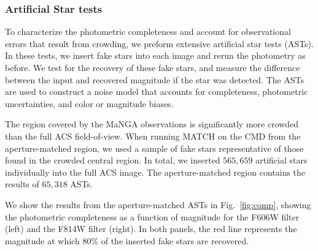 \documentclass[preprint2]{aastex62}
\begin{document}
\subsubsection{Artificial Star tests}

To characterize the photometric completeness and account for observational errors that result from crowding, we preform extensive artificial star tests (ASTs). In these tests, we insert fake stars into each image and rerun the photometry as before. We test for the recovery of these fake stars, and measure the difference between the input and recovered magnitude if the star was detected. The ASTs are used to construct a noise model that accounts for completeness, photometric uncertainties, and color or magnitude biases.

The region covered by the MaNGA observations is significantly more crowded than the full ACS field-of-view. When running MATCH on the CMD from the aperture-matched region, we used a sample of fake stars representative of those found in the crowded central region. In total, we inserted $565,659$ artificial stars individually into the full ACS image. The aperture-matched region contains the results of $65,318$ ASTs.

We show the results from the aperture-matched ASTs in Fig.~\ref{fig:comp}, showing the photometric completeness as a function of magnitude for the F606W filter (left) and the F814W filter (right). In both panels, the red line represents the magnitude at which 80\% of the inserted fake stars are recovered.
\end{document}
